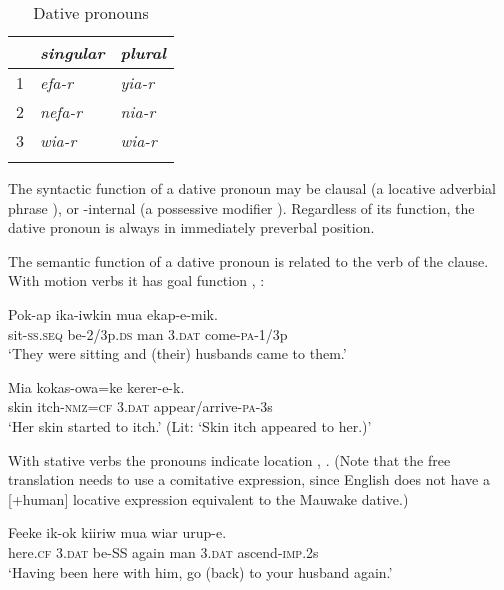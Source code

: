 \begin{table}
\caption{Dative pronouns}
\label{tab:3:dativepron}
 
\begin{tabular}{l>{\itshape}l>{\itshape}l}
\mytoprule
 &\upshape singular &\upshape plural\\
\midrule
1 &efa-r &yia-r\\
2 &nefa-r &nia-r\\
3 &wia-r &wia-r\\
\mybottomrule
\end{tabular}
\end{table}


The syntactic function of a dative pronoun may be clausal (a locative adverbial phrase ), or -internal (a possessive modifier ). Regardless of its function, the dative pronoun is always in immediately preverbal position. 

The semantic function of a dative pronoun is related to the verb of the clause. With motion verbs it has goal function , : 

\ea%
\label{ex:3:x1781}
\gll Pok-ap ika-iwkin mua  ekap-e-mik. \\
sit-\textsc{ss}.\textsc{seq} be-2/3p.\textsc{ds} man 3.\textsc{dat} come-\textsc{pa}-1/3p\\
\glt`They were sitting and (their) husbands came to them.'
\z

\ea%
\label{ex:3:x580}
\gll Mia kokas-owa=ke  kerer-e-k. \\
skin itch-\textsc{nmz}=\textsc{cf} 3.\textsc{dat} appear/arrive-\textsc{pa}-3s\\
\glt`Her skin started to itch.' (Lit: `Skin itch appeared to her.)' 
\z

With stative verbs the pronouns indicate location , . (Note that the free translation needs to use a comitative expression, since English does not have a [+human] locative expression equivalent to the Mauwake dative.) 

\ea%
\label{ex:3:x1782}
\gll Feeke  ik-ok kiiriw mua wiar urup-e. \\
here.\textsc{cf} 3.\textsc{dat} be-SS again man 3.\textsc{dat} ascend-\textsc{imp}.2s\\
\glt`Having been here with him, go (back) to your husband again.'
\z

